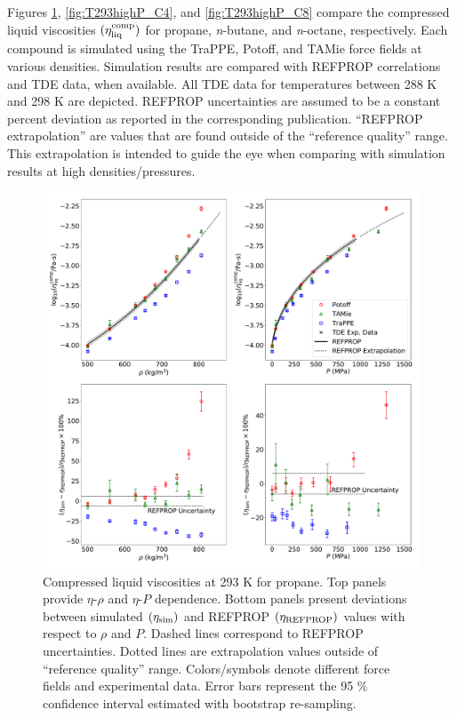\documentclass[preprint,review,12pt]{elsarticle}
\begin{document}
	Figures \ref{fig:T293highP_C3}, \ref{fig:T293highP_C4}, and \ref{fig:T293highP_C8} compare the compressed liquid viscosities $(\eta_{\rm liq}^{\rm comp})$ for propane, \textit{n}-butane, and \textit{n}-octane, respectively. Each compound is simulated using the TraPPE, Potoff, and TAMie force fields at various densities. Simulation results are compared with REFPROP correlations and TDE data, when available. All TDE data for temperatures between 288 K and 298 K are depicted. REFPROP uncertainties are assumed to be a constant percent deviation as reported in the corresponding publication. ``REFPROP extrapolation'' are values that are found outside of the ``reference quality'' range. This extrapolation is intended to guide the eye when comparing with simulation results at high densities/pressures.
	
	
	
	\begin{figure}[htb!]
		\centering
		\includegraphics[width=6.4in]{compare_REFPROP_T293highP_C3H8.pdf}
		\caption{Compressed liquid viscosities at 293 K for propane. Top panels provide $\eta$-$\rho$ and $\eta$-$P$ dependence. Bottom panels present deviations between simulated $(\eta_{\rm sim})$ and REFPROP $(\eta_{\rm REFPROP})$ values with respect to $\rho$ and $P$. Dashed lines correspond to REFPROP uncertainties. Dotted lines are extrapolation values outside of ``reference quality'' range. Colors/symbols denote different force fields and experimental data. Error bars represent the 95 \% confidence interval estimated with bootstrap re-sampling.}
		\label{fig:T293highP_C3}
	\end{figure} 
\end{document}
